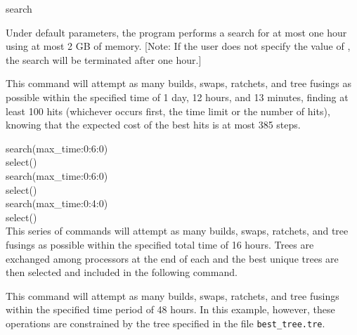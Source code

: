 \begin{command}{search}{}
\begin{arguments}


    \end{arguments}

        {Under default parameters, the program performs a search for at most one
        hour using at most 2 GB of memory. [Note: If the user does not specify
        the value of , the search will be terminated
        after one hour.]}
        
    \begin{poyexamples}
        
            {This command will attempt as many builds, swaps, ratchets, and tree
            fusings as possible within the specified time of 1 day, 12 hours, and 13
            minutes, finding at least 100 hits (whichever occurs first, the time
            limit or the number of hits), knowing that the expected cost of the
            best hits is at most 385 steps.}

            {{search(max\_time:0:6:0)}\\
            {select()}\\
            {search(max\_time:0:6:0)}\\
            {select()}\\
            {search(max\_time:0:4:0)}\\
            {select()}\\
            {This series of commands will attempt as many builds, swaps, ratchets, and tree
            fusings as possible within the specified total time of 16 hours.  Trees are exchanged among
            processors at the end of each  and the best unique trees
            are then selected and included in the following  command.}}
          
            {This command will attempt as many builds, swaps, ratchets, and tree
            fusings within the specified time period of 48 hours. In this example, however, these 
            operations are constrained by the tree specified in the file \texttt{best\_tree.tre}.} 
                  

\end{poyexamples}
\end{command}
